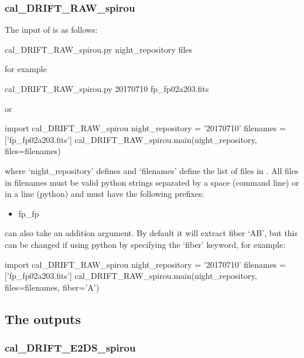 
\subsubsection{cal\_DRIFT\_RAW\_spirou}

The input of \calDRIFTRAW is as follows:
\begin{cmdbox}
cal_DRIFT_RAW_spirou.py night_repository files
\end{cmdbox}
\noindent for example
\begin{cmdbox}[title={example}]
cal_DRIFT_RAW_spirou.py 20170710 fp_fp02a203.fits
\end{cmdbox}
\noindent or
\begin{pythonbox}
import cal_DRIFT_RAW_spirou
night_repository = '20170710'
filenames = ['fp_fp02a203.fits']
cal_DRIFT_RAW_spirou.main(night_repository, files=filenames)
\end{pythonbox}

\noindent where `night\_repository' defines \argnightname and `filenames' define the list of files in \argfilenames. All files in filenames must be valid python strings separated by a space (command line) or in a line (python) and must have the following prefixes:
\begin{itemize}
	\item fp\_fp
\end{itemize}

\begin{note}
\calDRIFTRAW can also take an addition argument. By default it will extract fiber `AB', but this can be changed if using python by specifying the `fiber' keyword, for example:
\begin{pythonbox}
import cal_DRIFT_RAW_spirou
night_repository = '20170710'
filenames = ['fp_fp02a203.fits']
cal_DRIFT_RAW_spirou.main(night_repository, files=filenames, fiber='A')
\end{pythonbox}
\end{note}

\subsection{The outputs}

\subsubsection{cal\_DRIFT\_E2DS\_spirou}

